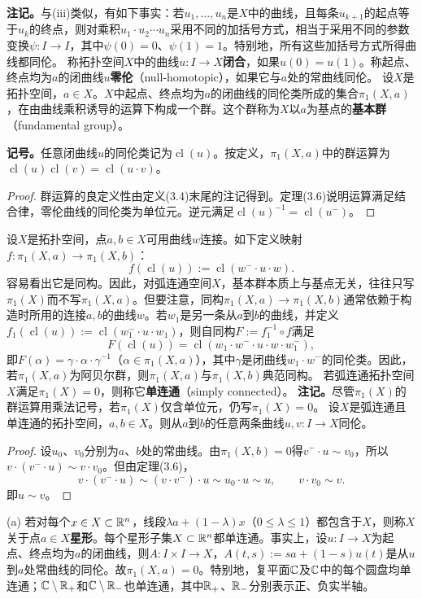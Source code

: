 \textbf{注记。}与(iii)类似，有如下事实：若$u_1,\ldots,u_n$是$X$中的曲线，且每条$u_{k+1}$的起点等于$u_k$的终点，则对乘积$u_1\cdot u_2\cdots u_n$采用不同的加括号方式，相当于采用不同的参数变换$\psi:I\to I$，其中$\psi(0)=0$、$\psi(1)=1$。特别地，所有这些加括号方式所得曲线都同伦。
称拓扑空间$X$中的曲线$u:I\to X$\textbf{闭合}，如果$u(0)=u(1)$。称起点、终点均为$a$的闭曲线$u$\textbf{零伦}（null-homotopic），如果它与$a$处的常曲线同伦。
设$X$是拓扑空间，$a\in X$。$X$中起点、终点均为$a$的闭曲线的同伦类所成的集合$\pi_1(X,a)$，在由曲线乘积诱导的运算下构成一个群。这个群称为$X$以$a$为基点的\textbf{基本群}（fundamental group）。

\textbf{记号。}任意闭曲线$u$的同伦类记为$\operatorname{cl}(u)$。按定义，$\pi_1(X,a)$中的群运算为$\operatorname{cl}(u)\operatorname{cl}(v)=\operatorname{cl}(u\cdot v)$。
\begin{proof}
群运算的良定义性由定义(3.4)末尾的注记得到。定理(3.6)说明运算满足结合律，零伦曲线的同伦类为单位元。逆元满足$\operatorname{cl}(u)^{-1}=\operatorname{cl}(u^-)$。
\end{proof}
设$X$是拓扑空间，点$a,b\in X$可用曲线$w$连接。如下定义映射$f:\pi_1(X,a)\to\pi_1(X,b)$：
\[
f(\operatorname{cl}(u)):=\operatorname{cl}(w^-\cdot u\cdot w).
\]
容易看出它是同构。因此，对弧连通空间$X$，基本群本质上与基点无关，往往只写$\pi_1(X)$而不写$\pi_1(X,a)$。但要注意，同构$\pi_1(X,a)\to\pi_1(X,b)$通常依赖于构造时所用的连接$a,b$的曲线$w$。若$w_1$是另一条从$a$到$b$的曲线，并定义$f_1(\operatorname{cl}(u)):=\operatorname{cl}(w_1^-\cdot u\cdot w_1)$，则自同构$F:=f_1^{-1}\circ f$满足
\[
F(\operatorname{cl}(u))=\operatorname{cl}(w_1\cdot w^-\cdot u\cdot w\cdot w_1^-),
\]
即$F(\alpha)=\gamma\cdot\alpha\cdot\gamma^{-1}$（$\alpha\in\pi_1(X,a)$），其中$\gamma$是闭曲线$w_1\cdot w^-$的同伦类。因此，若$\pi_1(X,a)$为阿贝尔群，则$\pi_1(X,a)$与$\pi_1(X,b)$典范同构。
若弧连通拓扑空间$X$满足$\pi_1(X)=0$，则称它\textbf{单连通}（simply connected）。
\textbf{注记。}尽管$\pi_1(X)$的群运算用乘法记号，若$\pi_1(X)$仅含单位元，仍写$\pi_1(X)=0$。
设$X$是弧连通且单连通的拓扑空间，$a,b\in X$。则从$a$到$b$的任意两条曲线$u,v:I\to X$同伦。
\begin{proof}
设$u_0$、$v_0$分别为$a$、$b$处的常曲线。由$\pi_1(X,b)=0$得$v^-\cdot u\sim v_0$，所以$v\cdot(v^-\cdot u)\sim v\cdot v_0$。但由定理(3.6)，
\[
v\cdot(v^-\cdot u)\sim(v\cdot v^-)\cdot u\sim u_0\cdot u\sim u,\qquad v\cdot v_0\sim v.
\]
即$u\sim v$。
\end{proof}
(a) 若对每个$x\in X\subset\mathbb R^n$，线段$\lambda a+(1-\lambda)x$（$0\le\lambda\le1$）都包含于$X$，则称$X$关于点$a\in X$\textbf{星形}。每个星形子集$X\subset\mathbb R^n$都单连通。事实上，设$u:I\to X$为起点、终点均为$a$的闭曲线，则$A:I\times I\to X$，$A(t,s):=sa+(1-s)u(t)$是从$u$到$a$处常曲线的同伦。故$\pi_1(X,a)=0$。特别地，复平面$\mathbb C$及$\mathbb C$中的每个圆盘均单连通；$\mathbb C\setminus\mathbb R_+$和$\mathbb C\setminus\mathbb R_-$也单连通，其中$\mathbb R_+$、$\mathbb R_-$分别表示正、负实半轴。

